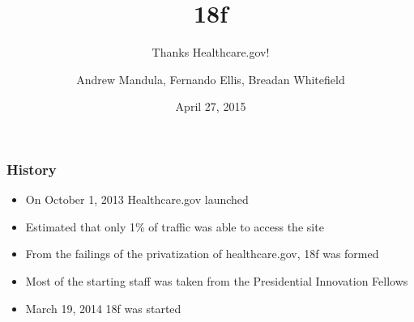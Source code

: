 \documentclass[10pt, compress]{beamer}
\title{18f}
\subtitle{Thanks Healthcare.gov!}
\date{April 27, 2015}
\author{Andrew Mandula, Fernando Ellis, Breadan Whitefield}
\institute{}
\begin{document}
\maketitle


\begin{frame}[fragile]
  \frametitle{History}
  \begin{itemize}
  \item On October 1, 2013 Healthcare.gov launched
  \item Estimated that only 1\% of traffic was able to access the site
  \item From the failings of the privatization of healthcare.gov, 18f was formed
  \item Most of the starting staff was taken from the Presidential Innovation Fellows
  \item March 19, 2014 18f was started
\end{itemize}
 
\end{frame}
\end{document}
